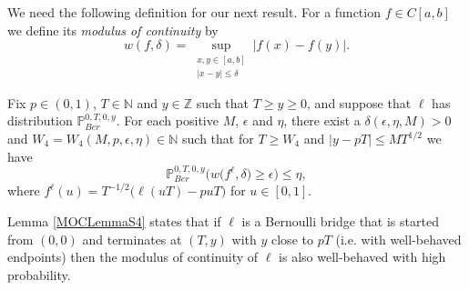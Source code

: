 We need the following definition for our next result. For a function $f \in C[a,b]$ we define its {\em modulus of continuity} by
\begin{equation}\label{MOCS4}
w(f,\delta) = \sup_{\substack{x,y \in [a,b]\\ |x-y| \leq \delta}} |f(x) - f(y)|.
\end{equation}
\begin{lemma}\label{MOCLemmaS4}Fix $p \in (0,1)$, $T \in \mathbb{N}$ and $y\in \mathbb{Z}$ such that $T \geq y \geq 0$, and suppose that $\ell$ has distribution $\mathbb{P}^{0,T,0,y}_{Ber}$. For each positive $M$, $\epsilon$ and $\eta$, there exist a $\delta(\epsilon, \eta, M) > 0$ and $W_4 = W_4(M, p, \epsilon, \eta) \in \mathbb{N}$ such that  for $T \geq W_4$ and $|y - pT| \leq MT^{1/2}$ we have
\begin{equation}\label{MOCeqS4}
\mathbb{P}^{0,T,0,y}_{Ber}\Big( w\big({f^\ell},\delta\big) \geq \epsilon \Big) \leq \eta,
\end{equation}
where $f^\ell(u) = T^{-1/2}\big(\ell(uT) - puT\big)$  for $u \in [0,1]$.
\end{lemma}
\begin{remark}
Lemma \ref{MOCLemmaS4} states that if $\ell$ is a Bernoulli bridge that is started from $(0,0)$ and terminates at $(T,y)$ with $y$ close to $pT$ (i.e. with well-behaved endpoints) then the modulus of continuity of $\ell$ is also well-behaved with high probability.
\end{remark}
